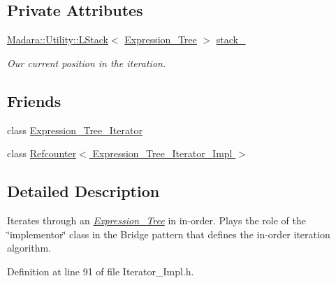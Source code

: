 \subsection*{Private Attributes}
\begin{DoxyCompactItemize}
\item 
\hyperlink{classMadara_1_1Utility_1_1LStack}{Madara::Utility::LStack}$<$ \hyperlink{classMadara_1_1Expression__Tree_1_1Expression__Tree}{Expression\_\-Tree} $>$ \hyperlink{classMadara_1_1Expression__Tree_1_1In__Order__Iterator__Impl_ae663e4bd7d1c4bbe8cbfce94bea3ca78}{stack\_\-}
\begin{DoxyCompactList}\small\item\em Our current position in the iteration. \item\end{DoxyCompactList}\end{DoxyCompactItemize}
\subsection*{Friends}
\begin{DoxyCompactItemize}
\item 
class \hyperlink{classMadara_1_1Expression__Tree_1_1In__Order__Iterator__Impl_adfe8d209b4dd64ac100d4c9c9adf08c1}{Expression\_\-Tree\_\-Iterator}
\item 
class \hyperlink{classMadara_1_1Expression__Tree_1_1In__Order__Iterator__Impl_aebe1f916414d809cae08793459b42a35}{Refcounter$<$ Expression\_\-Tree\_\-Iterator\_\-Impl $>$}
\end{DoxyCompactItemize}


\subsection{Detailed Description}
Iterates through an {\itshape \hyperlink{classMadara_1_1Expression__Tree_1_1Expression__Tree}{Expression\_\-Tree}\/} in in-\/order. Plays the role of the \char`\"{}implementor\char`\"{} class in the Bridge pattern that defines the in-\/order iteration algorithm. 

Definition at line 91 of file Iterator\_\-Impl.h.



